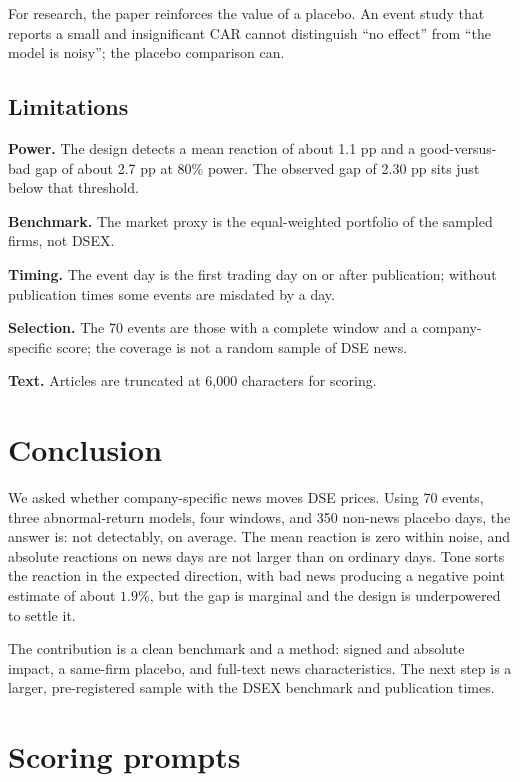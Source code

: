 \documentclass[10pt,twocolumn,a4paper]{article}
\begin{document}
For research, the paper reinforces the value of a placebo. An event study that reports a small and
insignificant CAR cannot distinguish ``no effect'' from ``the model is noisy''; the placebo comparison
can.

\subsection{Limitations}

\textbf{Power.} The design detects a mean reaction of about 1.1 pp and a good-versus-bad gap of about
2.7 pp at 80\% power. The observed gap of 2.30 pp sits just below that threshold.

\textbf{Benchmark.} The market proxy is the equal-weighted portfolio of the sampled firms, not DSEX.

\textbf{Timing.} The event day is the first trading day on or after publication; without publication
times some events are misdated by a day.

\textbf{Selection.} The 70 events are those with a complete window and a company-specific score; the
coverage is not a random sample of DSE news.

\textbf{Text.} Articles are truncated at 6,000 characters for scoring.

\section{Conclusion}

We asked whether company-specific news moves DSE prices. Using 70 events, three abnormal-return models,
four windows, and 350 non-news placebo days, the answer is: not detectably, on average. The mean
reaction is zero within noise, and absolute reactions on news days are not larger than on ordinary
days. Tone sorts the reaction in the expected direction, with bad news producing a negative point
estimate of about $1.9\%$, but the gap is marginal and the design is underpowered to settle it.

The contribution is a clean benchmark and a method: signed and absolute impact, a same-firm placebo,
and full-text news characteristics. The next step is a larger, pre-registered sample with the DSEX
benchmark and publication times.

\onecolumn
\appendix

\section{Scoring prompts}
\end{document}
